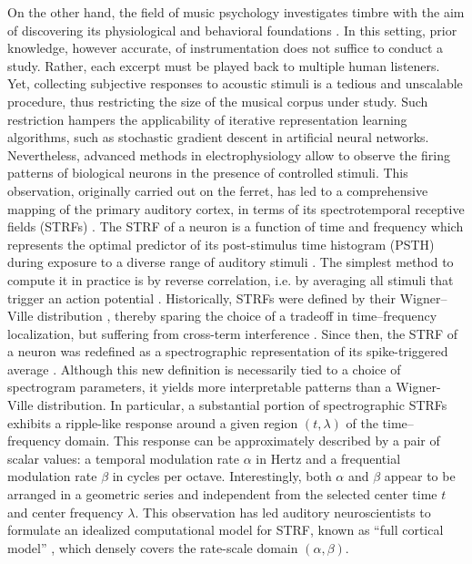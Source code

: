 \documentclass{bmcart}
\begin{document}
On the other hand, the field of music psychology investigates timbre with the aim of discovering its physiological and behavioral foundations \cite{mcadams2009chapter}.
In this setting, prior knowledge, however accurate, of instrumentation does not suffice to conduct a study.
Rather, each excerpt must be played back to multiple human listeners.
Yet, collecting subjective responses to acoustic stimuli is a tedious and unscalable procedure, thus restricting the size of the musical corpus under study.
Such restriction hampers the applicability of iterative representation learning algorithms, such as stochastic gradient descent in artificial neural networks.
Nevertheless, advanced methods in electrophysiology allow to observe the firing patterns of biological neurons in the presence of controlled stimuli.
This observation, originally carried out on the ferret, has led to a comprehensive mapping of the primary auditory cortex, in terms of its spectrotemporal receptive fields (STRFs) \cite{depireux2001jneur}.
The STRF of a neuron is a function of time and frequency which represents the optimal predictor of its post-stimulus time histogram (PSTH) during exposure to a diverse range of auditory stimuli \cite{aertsen1981biolcyb}.
The simplest method to compute it in practice is by reverse correlation, i.e. by averaging all stimuli that trigger an action potential \cite{deboer1968biomed}.
Historically, STRFs were defined by their Wigner--Ville distribution \cite{flandrin1998book}, thereby sparing the choice of a tradeoff in time--frequency localization, but suffering from cross-term interference \cite{eggermont1993hearing}.
Since then, the STRF of a neuron was redefined as a spectrographic representation of its spike-triggered average \cite{klein2000compneur}.
Although this new definition is necessarily tied to a choice of spectrogram parameters, it yields more interpretable patterns than a Wigner-Ville distribution.
In particular, a substantial portion of spectrographic STRFs exhibits a ripple-like response around a given region $(t, \lambda)$ of the time--frequency domain.
This response can be approximately described by a pair of scalar values: a temporal modulation rate $\alpha$ in Hertz and a frequential modulation rate $\beta$ in cycles per octave.
Interestingly, both $\alpha$ and $\beta$ appear to be arranged in a geometric series and independent from the selected center time $t$ and center frequency $\lambda$.
This observation has led auditory neuroscientists to formulate an idealized computational model for STRF, known as ``full cortical model'' \cite{chi2005jasa}, which densely covers the rate-scale domain $(\alpha, \beta)$.
\end{document}
